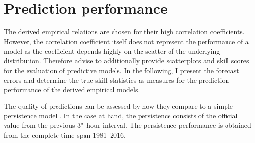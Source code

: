 \clearpage

\section{Prediction performance}
\label{sec:prediction_performance}
The derived empirical relations are chosen for their high correlation coefficients. However, the correlation coefficient itself does not represent the performance of a model as the coefficient depends highly on the scatter of the underlying distribution. Therefore \citet{Wing2005} advise to additionally provide scatterplots and skill scores for the evaluation of predictive models. In the following, I present the forecast errors and determine the true skill statistics as measures for the prediction performance of the derived empirical models.

The quality of predictions can be assessed by how they compare to a simple persistence model \citep{Detman1999}. In the case at hand, the persistence consists of the official \Kp{} value from the previous 3"~hour interval. The persistence performance is obtained from the complete \Kp{} time span 1981--2016.

